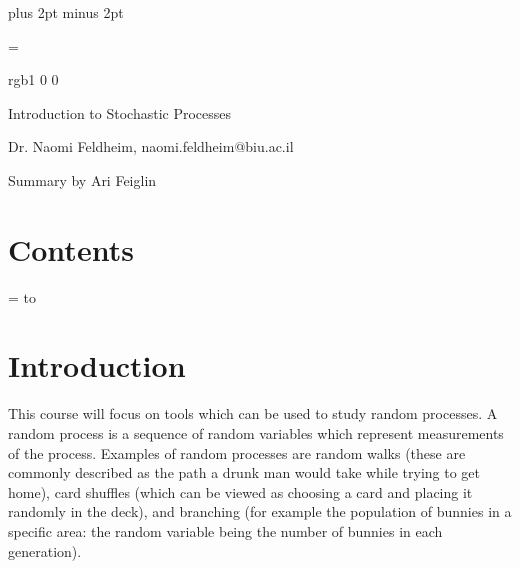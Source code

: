 

\parindent=0cm
\parskip=3pt plus 2pt minus 2pt



\footline={}



\color rgb{1 0 0}

{\def\boxshadowcolor{rgb{.8 0 0}}

    \centerline{Introduction to Stochastic Processes}
    \smallskip
    \centerline{Dr. Naomi Feldheim, naomi.feldheim@biu.ac.il}
    \centerline{Summary by Ari Feiglin}

\eppbox

\bigskip

\section*{Contents}

\tableofcontents
\eppbox

}

\vfill\break

\color{black}

\null
\vfill\break

\newif\ifpageodd
\pageoddtrue
\headline={%
    \hbox to \hsize{\color{black}%
        \ifpageodd\hfil{\it\currsubsection\quad\bf\folio}\global\pageoddfalse%
        \else{\bf\folio\quad\it\currsubsection}\hfil\global\pageoddtrue\fi%
    }%
}

\section{Introduction}

This course will focus on tools which can be used to study random processes.
A random process is a sequence of random variables which represent measurements of the process.
Examples of random processes are random walks (these are commonly described as the path a drunk man would take while trying to get home), card shuffles (which can be viewed as choosing a card and placing
it randomly in the deck), and branching (for example the population of bunnies in a specific area: the random variable being the number of bunnies in each generation).

